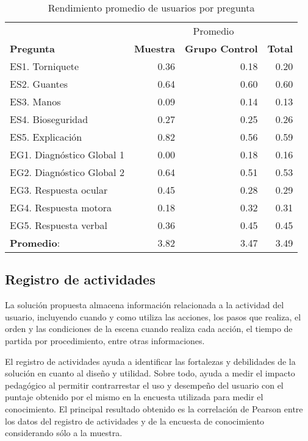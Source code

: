 \begin{table}
\centering
\caption{Rendimiento promedio de usuarios por pregunta}
\begin{tabular}{lrrr}
\toprule
& \multicolumn{3}{c}{Promedio} \\
\cmidrule(lr){2-4}
\textbf{Pregunta} & 
\textbf{Muestra} & 
\textbf{Grupo Control} & 
\textbf{Total} \\ 
\midrule
ES1. Torniquete           & 0.36 & 0.18 & 0.20 \\
ES2. Guantes              & 0.64 & 0.60 & 0.60 \\
ES3. Manos                & 0.09 & 0.14 & 0.13 \\
ES4. Bioseguridad         & 0.27 & 0.25 & 0.26 \\
ES5. Explicación          & 0.82 & 0.56 & 0.59 \\
\midrule
EG1. Diagnóstico Global 1 & 0.00 & 0.18 & 0.16 \\
EG2. Diagnóstico Global 2 & 0.64 & 0.51 & 0.53 \\
EG3. Respuesta ocular     & 0.45 & 0.28 & 0.29 \\
EG4. Respuesta motora     & 0.18 & 0.32 & 0.31 \\
EG5. Respuesta verbal     & 0.36 & 0.45 & 0.45 \\
\midrule
\textbf{Promedio}: & 3.82 & 3.47 & 3.49  \\
\bottomrule
\end{tabular}

\label{tab:objetiva_rendimiento_por_pregunta}
\end{table}

\subsection{Registro de actividades}

La solución propuesta almacena información relacionada a la actividad del
usuario, incluyendo cuando y como utiliza las acciones, los pasos que realiza,
el orden y las condiciones de la escena cuando realiza cada acción, el tiempo de
partida por procedimiento, entre otras informaciones.

El registro de actividades ayuda a identificar las  fortalezas y debilidades de
la solución en cuanto al diseño y utilidad. Sobre todo, ayuda a medir el impacto
pedagógico al permitir contrarrestar el uso y desempeño del usuario con el
puntaje obtenido por el mismo en la encuesta utilizada para medir el
conocimiento. El principal resultado obtenido es la correlación de 
Pearson\cite{BoslaughStatistics2008} entre los datos del registro de actividades y de
la encuesta de conocimiento considerando sólo a la muestra.

